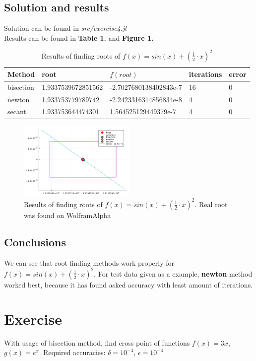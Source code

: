 \documentclass[11pt]{article}
\begin{document}
\subsection{Solution and results}
Solution can be found in \textit{src/exercise4.jl}\\
Results can be found in \textbf{Table 1.} and \textbf{Figure 1.}
\begin{table}[!ht]
    \centering
    \begin{tabular}{|l|l|l|l|l|}
    \hline
        \textbf{Method} & \textbf{root} & \textbf{$f(root)$} & \textbf{iterations} & \textbf{error} \\ \hline
        bisection & 1.9337539672851562 & -2.7027680138402843e-7 & 16 & 0 \\ \hline
        newton & 1.933753779789742 & -2.2423316314856834e-8 & 4 & 0 \\ \hline
        secant & 1.933753644474301 & 1.564525129449379e-7 & 4 & 0 \\ \hline
    \end{tabular}
    \caption{Results of finding roots of $f(x) = sin(x) + (\frac{1}{2}\cdot x)^2$}
\end{table}

\begin{figure}[h]
    \centering
    \includegraphics[width=0.5\textwidth]{ex4_plot.png}
    \caption{Results of finding roots of $f(x) = sin(x) + (\frac{1}{2}\cdot x)^2$. Real root was found on WolframAlpha}
\end{figure}
\subsection{Conclusions}
We can see that root finding methods work properly for $f(x) = sin(x) + (\frac{1}{2}\cdot x)^2$.
For test data given as a example, \textbf{newton} method worked best, because it has found asked accuracy with least amount of iterations.

\section{Exercise}
With usage of bisection method, find cross point of functions $f(x) = 3x$, $g(x) = e^x$. Required accuracies: $\delta=10^{-4}$, $\epsilon=10^{-4}$
\end{document}
